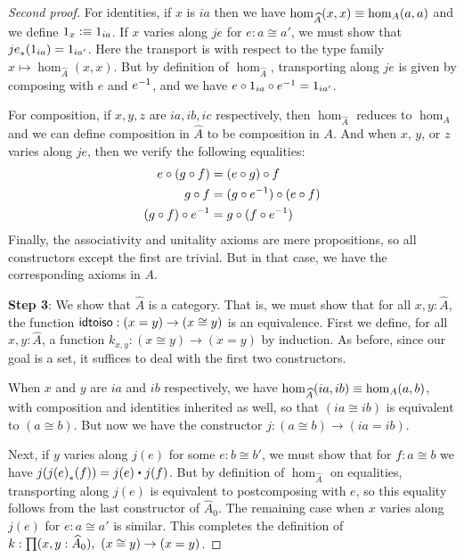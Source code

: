 \begin{proof}[Second proof]
  For identities, if $x$ is $ia$ then we have $\hom_{\widehat A}(x,x) \equiv \hom_A(a,a)$ and we define $1_x \vcentcolon\equiv 1_{ia}$.
  If $x$ varies along $je$ for $e:a\cong a'$, we must show that ${je}_{*}\!\left({1_{ia}}\right) = 1_{ia'}$.
  Here the transport is with respect to the type family $x\mapsto \hom_{\widehat A}(x,x)$.
  But by definition of $\hom_{\widehat A}$, transporting along $je$ is given by composing with $e$ and ${e}^{-1}$, and we have $e\circ 1_{ia} \circ {e}^{-1} = 1_{ia'}$.

  For composition, if $x,y,z$ are $ia,ib,ic$ respectively, then $\hom_{\widehat A}$ reduces to $\hom_A$ and we can define composition in $\widehat A$ to be composition in $A$.
  And when $x$, $y$, or $z$ varies along $je$, then we verify the following equalities:
  \begin{align*}
    e \circ (g\circ f) &= (e\circ g) \circ f\\
    g\circ f &= (g\circ {e}^{-1}) \circ (e\circ f)\\
    (g\circ f) \circ {e}^{-1} &= g \circ (f\circ {e}^{-1})
  \end{align*}
  Finally, the associativity and unitality axioms are mere propositions, so all constructors except the first are trivial.
  But in that case, we have the corresponding axioms in $A$.

  \medskip

  \textbf{Step 3}: We show that $\widehat A$ is a category.
  That is, we must show that for all $x,y:\widehat A$, the function $\mathsf{idtoiso}:(x=y) \to (x\cong y)$ is an equivalence.
  First we define, for all $x,y:\widehat A$, a function $k_{x,y}:(x\cong y) \to (x=y)$ by induction.
  As before, since our goal is a set, it suffices to deal with the first two constructors.

  When $x$ and $y$ are $ia$ and $ib$ respectively, we have $\hom_{\widehat A}(ia,ib)\equiv \hom_A(a,b)$, with composition and identities inherited as well, so that $(ia\cong ib)$ is equivalent to $(a\cong b)$.
  But now we have the constructor $j:(a\cong b) \to (ia=ib)$.

  Next, if $y$ varies along $j(e)$ for some $e:b\cong b'$, we must show that for $f:a\cong b$ we have $j(\trans{j(e)}{f}) = j(e) \ct j(f)$.
  But by definition of $\hom_{\widehat A}$ on equalities, transporting along $j(e)$ is equivalent to postcomposing with $e$, so this equality follows from the last constructor of $\widehat A_0$.
  The remaining case when $x$ varies along $j(e)$ for $e:a\cong a'$ is similar.
  This completes the definition of $k:\prd{x,y:\widehat A_0} (x\cong y) \to (x=y)$.


\end{proof}
